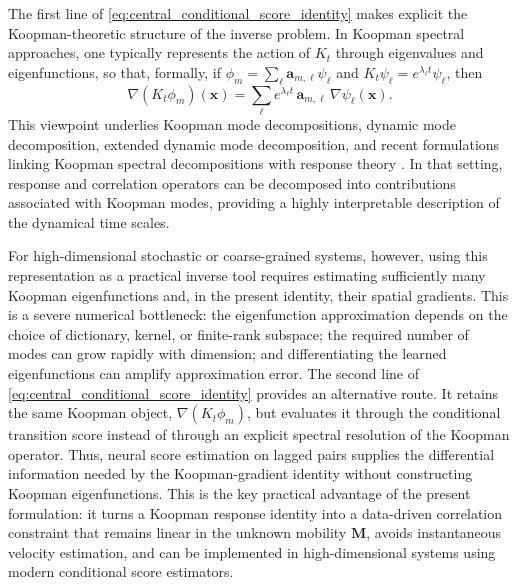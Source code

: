 \documentclass[11pt,twoside,fleqn]{article}
\begin{document}
The first line of \eqref{eq:central_conditional_score_identity} makes explicit
the Koopman-theoretic structure of the inverse problem. In Koopman spectral
approaches, one typically represents the action of \(K_t\) through eigenvalues
and eigenfunctions, so that, formally, if
\(\phi_m=\sum_{\ell}\bm{a}_{m,\ell}\psi_\ell\) and
\(K_t\psi_\ell=e^{\lambda_\ell t}\psi_\ell\), then
\[
    \nabla(K_t\phi_m)(\bm{x})
    =
    \sum_{\ell}
        e^{\lambda_\ell t}\,
        \bm{a}_{m,\ell}\,
        \nabla\psi_\ell(\bm{x}) .
\]
This viewpoint underlies Koopman mode decompositions, dynamic mode
decomposition, extended dynamic mode decomposition, and recent formulations
linking Koopman spectral decompositions with response theory
\cite{Koopman1931,Mezic2005,BudisicMohrMezic2012,WilliamsKevrekidisRowley2015,KlusNuskeKoltaiWuKevrekidisSchutteNoe2018,SantosGutierrezLucariniChekrounGhil2021,ZagliColbrookLucariniMezicMoroney2026,LucariniSantosGutierrezMoroneyZagli2026}.
In that setting, response and correlation operators can be decomposed into
contributions associated with Koopman modes, providing a highly interpretable
description of the dynamical time scales.

For high-dimensional stochastic or coarse-grained systems, however, using this
representation as a practical inverse tool requires estimating sufficiently many
Koopman eigenfunctions and, in the present identity, their spatial gradients.
This is a severe numerical bottleneck: the eigenfunction approximation depends
on the choice of dictionary, kernel, or finite-rank subspace; the required number
of modes can grow rapidly with dimension; and differentiating the learned
eigenfunctions can amplify approximation error. The second line of
\eqref{eq:central_conditional_score_identity} provides an alternative route. It
retains the same Koopman object, \(\nabla(K_t\phi_m)\), but evaluates it through
the conditional transition score instead of through an explicit spectral
resolution of the Koopman operator. Thus, neural score estimation on lagged
pairs supplies the differential information needed by the Koopman-gradient
identity without constructing Koopman eigenfunctions. This is the key practical
advantage of the present formulation: it turns a Koopman response identity into
a data-driven correlation constraint that remains linear in the unknown mobility
\(\bm{M}\), avoids instantaneous velocity estimation, and can be implemented in
high-dimensional systems using modern conditional score estimators.
\end{document}
